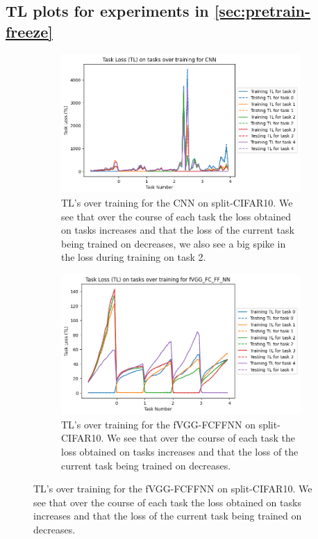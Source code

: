 \begin{appendices}


\section{TL plots for experiments in \cref{sec:pretrain-freeze}}
\label{sec:pretrain-freeze-TL}

\begin{figure}[ht]
    \centering
    \begin{subfigure}[t]{0.4\textwidth}
       \includegraphics[width=\linewidth]{images/CIFAR10_CL/CNN_TL_task.png}
       \caption{TL's over training for the CNN on split-CIFAR10. We see that over the course of each task the loss obtained on tasks increases and that the loss of the current task being trained on decreases, we also see a big spike in the loss during training on task 2.}
    \end{subfigure}
    \quad %
    \begin{subfigure}[t]{0.4\textwidth}
       \includegraphics[width=\linewidth]{images/CIFAR10_CL/fVGG_FC_FF_NN_TL_task.png}
       \caption{TL's over training for the fVGG-FCFFNN on split-CIFAR10. We see that over the course of each task the loss obtained on tasks increases and that the loss of the current task being trained on decreases.}
    \end{subfigure}
    

\end{figure}
\end{appendices}
